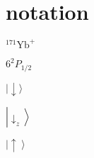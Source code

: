 




\section{notation}

${ }^{171} \mathrm{Yb}^{+}$

$6^2 P_{1 / 2}$

$|\downarrow\rangle$

$\left|\downarrow_z\right\rangle$

$\left|\uparrow\right\rangle$


